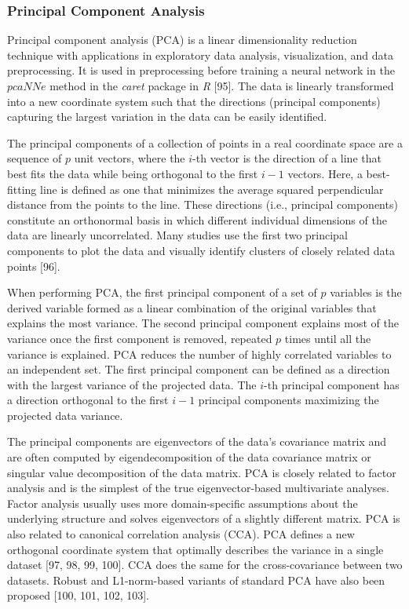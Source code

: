 \documentclass[preprint,12pt]{elsarticle}
\begin{document}
\subsubsection{Principal Component Analysis}

Principal component analysis (PCA) is a linear dimensionality reduction technique with applications in exploratory data analysis, visualization, and data preprocessing. It is used in preprocessing before training a neural network in the $pcaNNe$ method in the \textit{caret} package in \textit{R} [95]. The data is linearly transformed into a new coordinate system such that the directions (principal components) capturing the largest variation in the data can be easily identified.

The principal components of a collection of points in a real coordinate space are a sequence of $p$ unit vectors, where the $i$-th vector is the direction of a line that best fits the data while being orthogonal to the first $i-1$ vectors. Here, a best-fitting line is defined as one that minimizes the average squared perpendicular distance from the points to the line. These directions (i.e., principal components) constitute an orthonormal basis in which different individual dimensions of the data are linearly uncorrelated. Many studies use the first two principal components to plot the data and visually identify clusters of closely related data points [96].

When performing PCA, the first principal component of a set of $p$ variables is the derived variable formed as a linear combination of the original variables that explains the most variance. The second principal component explains most of the variance once the first component is removed, repeated $p$ times until all the variance is explained. PCA reduces the number of highly correlated variables to an independent set. The first principal component can be defined as a direction with the largest variance of the projected data. The $i$-th principal component has a direction orthogonal to the first $i-1$ principal components maximizing the projected data variance.

The principal components are eigenvectors of the data's covariance matrix and are often computed by eigendecomposition of the data covariance matrix or singular value decomposition of the data matrix. PCA is closely related to factor analysis and is the simplest of the true eigenvector-based multivariate analyses. Factor analysis usually uses more domain-specific assumptions about the underlying structure and solves eigenvectors of a slightly different matrix. PCA is also related to canonical correlation analysis (CCA). PCA defines a new orthogonal coordinate system that optimally describes the variance in a single dataset [97, 98, 99, 100]. CCA does the same for the cross-covariance between two datasets. Robust and L1-norm-based variants of standard PCA have also been proposed [100, 101, 102, 103].
\end{document}
